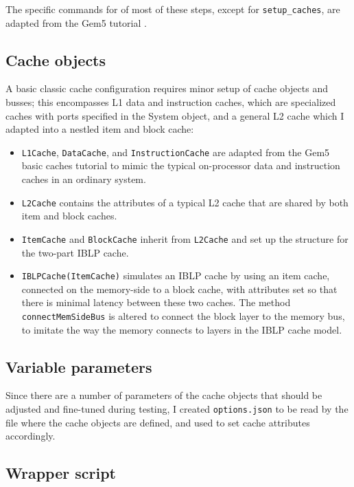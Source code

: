 \documentclass[12pt,twoside]{reedthesis}
\begin{document}
	The specific commands for of most of these steps, except for \verb`setup_caches`, are adapted from the Gem5 tutorial \cite{gem5-tutorial}.

	\subsection*{Cache objects}

	A basic classic cache configuration requires minor setup of cache objects and busses; this encompasses L1 data and instruction caches, which are specialized caches with ports specified in the System object, and a general L2 cache which I adapted into a nestled item and block cache:

	\begin{itemize}
		\item \verb`L1Cache`, \verb`DataCache`, and \verb`InstructionCache` are adapted from the Gem5 basic caches tutorial to mimic the typical on-processor data and instruction caches in an ordinary system.
	
		\item \verb`L2Cache` contains the attributes of a typical L2 cache that are shared by both item and block caches.
	
		\item \verb`ItemCache` and \verb`BlockCache` inherit from \verb`L2Cache` and set up the structure for the two-part IBLP cache.
	
		\item \verb`IBLPCache(ItemCache)` simulates an IBLP cache by using an item cache, connected on the memory-side to a block cache, with attributes set so that there is minimal latency between these two caches. The method \verb`connectMemSideBus` is altered to connect the block layer to the memory bus, to imitate the way the memory connects to layers in the IBLP cache model.
	\end{itemize}

	\subsection*{Variable parameters}

	Since there are a number of parameters of the cache objects that should be adjusted and fine-tuned during testing, I created \verb`options.json` to be read by the file where the cache objects are defined, and used to set cache attributes accordingly.

	\subsection*{Wrapper script}
\end{document}
